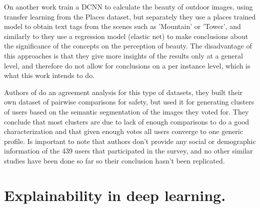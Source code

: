 On another work  train a DCNN to calculate the beauty of outdoor images,
using transfer learning from the Places dataset, but separately they use a places trained model to obtain text tags from
the scenes such as 'Mountain' or 'Tower', and similarly to  they use a regression model
(elastic net) to make conclusions about the significance of the concepts on the perception of beauty. The disadvantage
of this approaches is that they give more insights of the results only at a general level, and therefore do not allow for
conclusions on a per instance level, which is what this work intends to do.

Authors of  do an agreement analysis for this type of datasets,
they built their own dataset of pairwise comparisons for safety, but used it
for  generating clusters of users based on the semantic segmentation of the images they voted for.
They conclude that most clusters are due to lack of enough comparisons to do a good characterization
and that given enough votes all users converge to one generic profile. Is important to note
that authors don't provide any social or demographic information of the 439 users that
participated in the survey, and no other similar studies have been done so
far so their conclusion hasn't been replicated.


\section{ Explainability in deep learning.}